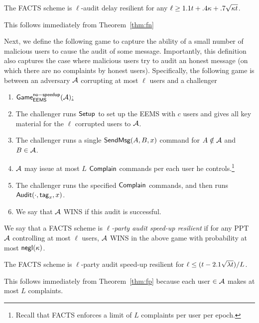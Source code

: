 \begin{theorem}
The FACTS scheme is $\ell$-audit delay resilient for any $\ell \ge 1.1t+.4\kappa + .7\sqrt{\kappa t}$.
\end{theorem}

\begin{proofsketch}
This follows immediately from Theorem~\ref{thm:fn}
\end{proofsketch}

Next, we define the following game to capture the 
ability of a small number of malicious users to cause the audit of some message.  Importantly, this definition also captures the case where malicious users try to audit an honest message (on which there are no complaints by honest users).  Specifically, the following game is between an adversary $\mathcal{A}$ corrupting at most $\ell$ users and a challenger

\begin{enumerate}
    \item[] \hspace{-2em} \underline{$\mathsf{Game}_{\mathsf{EEMS}}^{\mathsf{no-speedup}}(\mathcal{A})$:}
    \item The challenger runs $\textsf{Setup}$ to set up the EEMS with $c$ users and gives all key material for the $\ell$ corrupted users to $\mathcal{A}$.
    \item The challenger runs a single $\textsf{SendMsg}(A,B,x)$ command for $A \notin \mathcal{A}$ and $B \in \mathcal{A}$.
    \item $\mathcal{A}$ may issue at most $L$ $\textsf{Complain}$ commands per each user he controls.\footnote{Recall that FACTS enforces a limit of $L$ complaints per user per epoch.}
    \item The challenger runs the specified $\textsf{Complain}$ commands, and then runs $\textsf{Audit}(\cdot, \mathsf{tag}_x,x)$.
    \item We say that $\mathcal{A}$ WINS if this audit is successful.
\end{enumerate}

\begin{definition}[No speed up]
We say that a FACTS scheme is \emph{$\ell$-party audit speed-up resilient} if for any PPT $\mathcal{A}$ controlling at most $\ell$ users, $\mathcal{A}$ WINS in the above game with probability at most $\mathsf{negl}(\kappa)$.
\end{definition}

\begin{theorem}
The FACTS scheme is $\ell$-party audit speed-up resilient for $\ell \le (t - 2.1\sqrt{\lambda t})/L$.
\end{theorem}

\begin{proofsketch}
This follows immediately from Theorem~\ref{thm:fp} because each user $\in \mathcal{A}$ makes at most $L$ complaints.
\end{proofsketch}


